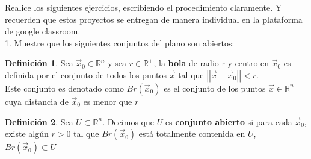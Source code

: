 \documentclass[letterpaper]{article}
\providecommand{\norm}[1]{\left|\left|#1\right|\right|}
\newcommand{\R}{\mathds{R}}
\renewcommand{\*}{\cdot}
\theoremstyle{definition}
\newtheorem{definition}{Definición}
\begin{document}
\noindent Realice los siguientes ejercicios, escribiendo el procedimiento claramente. Y recuerden que estos proyectos se entregan de manera individual en la plataforma de google classroom. \\[0.5cm]
1.  Muestre que los siguientes conjuntos del plano son abiertos: 
\begin{definition}
	Sea $ \vec{x}_0  \in \R^n$  y sea $ r \in \R^+ $, la \textbf{bola} de radio r y centro en $ \vec{x}_0 $ es definida por el conjunto de todos los puntos $ \vec{x} $ tal que $ \norm{\vec{x} - \vec{x}_0} < r $.\\ Este conjunto es denotado como $ Br(\vec{x}_0) $ es el conjunto de los puntos $ \vec{x} \in \R^n $ cuya distancia de $ \vec{x}_0 $ es menor que $ r $
\end{definition}

\begin{definition}
	Sea $ U \subset \R^n $. Decimos que $ U $ es \textbf{conjunto abierto} si para cada $ \vec{x}_0 $, existe algún $ r>0 $ tal que $ Br(\vec{x}_0) $ está totalmente contenida en $ U $, $ Br(\vec{x}_0) \subset U $

\end{definition}
\end{document}

